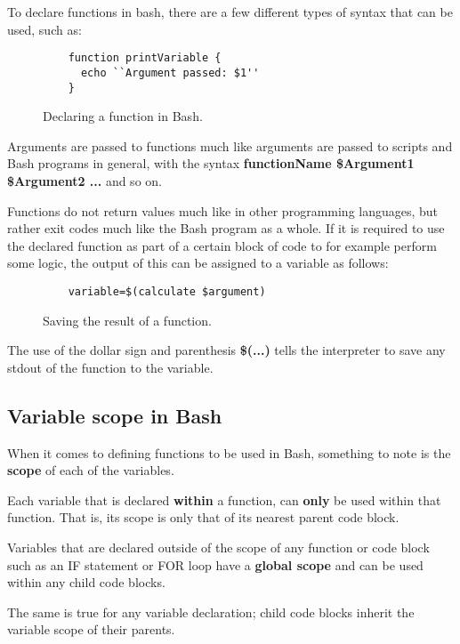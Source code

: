 \documentclass{article}
\begin{document}
To declare functions in bash, there are a few different types of syntax that can be used, such as:

\begin{figure}[h]
  \lstset{language=Bash}
  \begin{lstlisting}
    function printVariable {
      echo ``Argument passed: $1''
    }
  \end{lstlisting}
  \label{func1}
  \caption{Declaring a function in Bash.}
\end{figure}

Arguments are passed to functions much like arguments are passed to scripts and Bash programs in general, with the syntax \textbf{functionName \$Argument1 \$Argument2 ...} and so on.

Functions do not return values much like in other programming languages, but rather exit codes much like the Bash program as a whole. If
it is required to use the declared function as part of a certain block of code to for example perform some logic, the output of this can be assigned to a variable as follows:

\begin{figure}[h]
  \lstset{language=Bash}
  \begin{lstlisting}
    variable=$(calculate $argument)
  \end{lstlisting}
  \label{func2}
  \caption{Saving the result of a function.}
\end{figure}

The use of the dollar sign and parenthesis \textbf{\$(...)} tells the interpreter to save any stdout of the function to the variable.

\subsection{Variable scope in Bash}

When it comes to defining functions to be used in Bash, something to note is the \textbf{scope} of each of the variables.

Each variable that is declared \textbf{within} a function, can \textbf{only} be used within that function. That is, its scope is only that of its nearest parent code block.

Variables that are declared outside of the scope of any function or code block such as an IF statement or FOR loop have a \textbf{global scope} and can be used within any child code blocks.

The same is true for any variable declaration; child code blocks inherit the variable scope of their parents.



\end{document}
